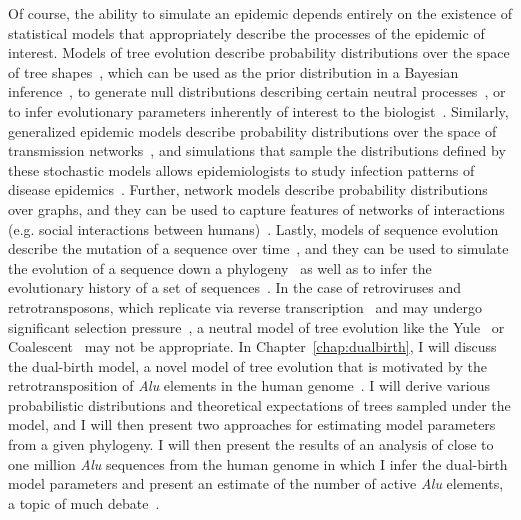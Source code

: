Of course, the ability to simulate an epidemic depends entirely on the existence of statistical models that appropriately describe the processes of the epidemic of interest. Models of tree evolution describe probability distributions over the space of tree shapes~\cite{Yule1925,Aldous2001}, which can be used as the prior distribution in a Bayesian inference~\cite{Drummond2007,Mooers2012,Sayyari2016}, to generate null distributions describing certain neutral processes~\cite{Guyer1991,Kirkpatrick1993,Agapow2002}, or to infer evolutionary parameters inherently of interest to the biologist~\cite{Morlon2014}. Similarly, generalized epidemic models describe probability distributions over the space of transmission networks~\cite{Sahneh2013}, and simulations that sample the distributions defined by these stochastic models allows epidemiologists to study infection patterns of disease epidemics~\cite{Sahneh2017}. Further, network models describe probability distributions over graphs, and they can be used to capture features of networks of interactions (e.g. social interactions between humans)~\cite{Watts1998,Watts1999,Barabasi1999,Erdos1959}. Lastly, models of sequence evolution describe the mutation of a sequence over time~\cite{Jukes1969,Kimura1980,Felsenstein1981,Tamura1993,Tavare1986}, and they can be used to simulate the evolution of a sequence down a phylogeny~\cite{Rambaut1997} as well as to infer the evolutionary history of a set of sequences~\cite{Felsenstein2003}. In the case of retroviruses and retrotransposons, which replicate via reverse transcription~\cite{Whitcomb1992} and may undergo significant selection pressure~\cite{Wood2009}, a neutral model of tree evolution like the Yule~\cite{Yule1925} or Coalescent~\cite{Kingman1982} may not be appropriate. In Chapter~\ref{chap:dualbirth}, I will discuss the dual-birth model, a novel model of tree evolution that is motivated by the retrotransposition of \textit{Alu} elements in the human genome~\cite{Batzer2002}. I will derive various probabilistic distributions and theoretical expectations of trees sampled under the model, and I will then present two approaches for estimating model parameters from a given phylogeny. I will then present the results of an analysis of close to one million \textit{Alu} sequences from the human genome in which I infer the dual-birth model parameters and present an estimate of the number of active \textit{Alu} elements, a topic of much debate~\cite{Price2004,Deininger2011,Cordaux2004}.

